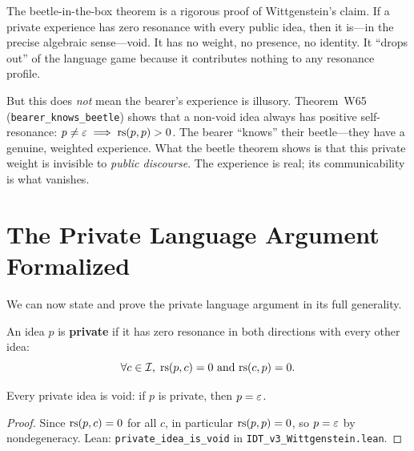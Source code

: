 \begin{interpretation}
\label{interp:beetle-content}
The beetle-in-the-box theorem is a rigorous proof of Wittgenstein's claim. If a
private experience has zero resonance with every public idea, then it is---in
the precise algebraic sense---void. It has no weight, no presence, no identity.
It ``drops out'' of the language game because it contributes nothing to any
resonance profile.

But this does \emph{not} mean the bearer's experience is illusory. Theorem~W65
(\texttt{bearer\_knows\_beetle}) shows that a non-void idea always has positive
self-resonance: $p \neq \varepsilon \implies \mathrm{rs}(p, p) > 0$. The bearer ``knows''
their beetle---they have a genuine, weighted experience. What the beetle
theorem shows is that this private weight is invisible to \emph{public discourse}.
The experience is real; its communicability is what vanishes.
\end{interpretation}

\section{The Private Language Argument Formalized}

We can now state and prove the private language argument in its full generality.

\begin{definition}
\label{def:private-idea}
An idea $p$ is \textbf{private} if it has zero resonance in both directions
with every other idea:
\[
\forall c \in \mathcal{I},\; \mathrm{rs}(p, c) = 0 \text{ and } \mathrm{rs}(c, p) = 0.
\]
\end{definition}

\begin{theorem}
\label{thm:private-language}
Every private idea is void: if $p$ is private, then $p = \varepsilon$.
\end{theorem}

\begin{proof}
Since $\mathrm{rs}(p, c) = 0$ for all $c$, in particular $\mathrm{rs}(p, p) = 0$, so
$p = \varepsilon$ by nondegeneracy.
Lean: \texttt{private\_idea\_is\_void} in \texttt{IDT\_v3\_Wittgenstein.lean}.
\end{proof}

